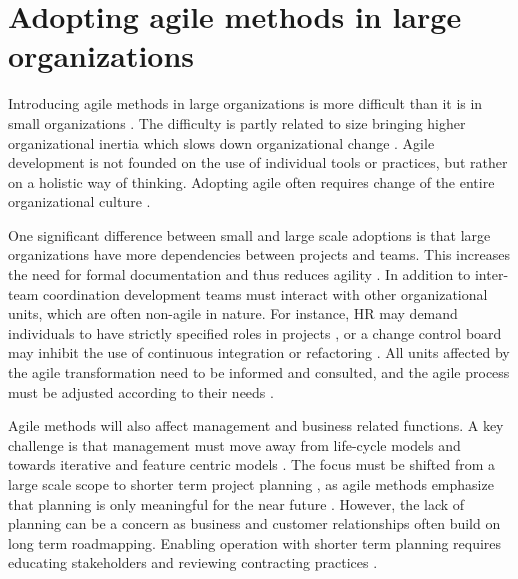 \section{Adopting agile methods in large organizations}

Introducing agile methods in large organizations is more difficult than it is in
small organizations \citep{Dyba2008}. The difficulty is partly related to size
bringing higher organizational inertia which slows down organizational change
\citep{Livermore2008}. Agile development is not founded on the use of individual
tools or practices, but rather on a holistic way of thinking. Adopting agile
often requires change of the entire organizational culture \citep{Misra2010}.

One significant difference between small and large scale adoptions is that large
organizations have more dependencies between projects and teams. This increases
the need for formal documentation and thus reduces agility \citep{Lindvall2004}.
In addition to inter-team coordination development teams must interact with
other organizational units, which are often non-agile in nature. For instance,
HR may demand individuals to have strictly specified roles in projects
\citep{Boehm2005}, or a change control board may inhibit the use of continuous
integration or refactoring \citep{Lindvall2004}. All units affected by the agile
transformation need to be informed and consulted, and the agile process must be
adjusted according to their needs \citep{Lindvall2004, Cohn2003, Boehm2005}.

Agile methods will also affect management and business related functions. A key
challenge is that management must move away from life-cycle models and towards
iterative and feature centric models \citep{Nerur2005}. The focus must be shifted
from a large scale scope to shorter term project planning \citep{Misra2010}, as
agile methods emphasize that planning is only meaningful for the near future
\citep{Cohn2003}. However, the lack of planning can be a concern as business and
customer relationships often build on long term roadmapping. Enabling operation
with shorter term planning requires educating stakeholders and reviewing
contracting practices \citep{Boehm2005}.


% 

% 


